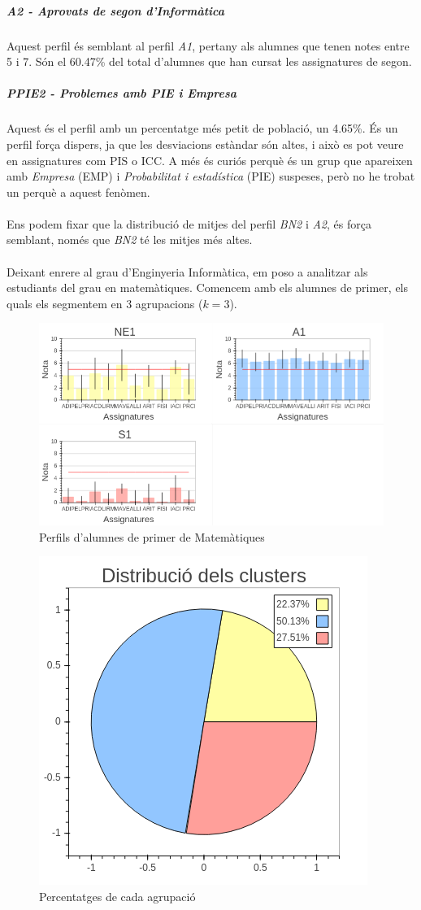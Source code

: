 \documentclass[12pt,a4paper,catalan]{article}
\begin{document}
\subparagraph{A2 - Aprovats de segon d'Informàtica}
Aquest perfil és semblant al perfil \textit{A1}, pertany als alumnes que tenen notes entre 5 i 7. Són el 60.47\% del total d'alumnes que han cursat les assignatures de segon.

\subparagraph{PPIE2 - Problemes amb PIE i Empresa}
Aquest és el perfil amb un percentatge més petit de població, un 4.65\%. És un perfil força dispers, ja que les desviacions estàndar són altes, i això es pot veure en assignatures com PIS o ICC. A més és curiós perquè és un grup que apareixen amb \textit{Empresa} (EMP) i \textit{Probabilitat i estadística} (PIE) suspeses, però no he trobat un perquè a aquest fenòmen.
\\
\\
Ens podem fixar que la distribució de mitjes del perfil \textit{BN2} i \textit{A2}, és força semblant, només que \textit{BN2} té les mitjes més altes.
\\
\\
Deixant enrere al grau d'Enginyeria Informàtica, em poso a analitzar als estudiants del grau en matemàtiques. Comencem amb els alumnes de primer, els quals els segmentem en 3 agrupacions ($k=3$).

\newpage

\begin{figure}[h]
\centering
\includegraphics[width=.9\linewidth]{img/perfils_primer_mates.png}
\caption{Perfils d'alumnes de primer de Matemàtiques}
\end{figure}

\begin{figure}[h]
\centering
\includegraphics[width=.4\linewidth]{img/perfils_primer_mates_pastilla.png}
\caption{Percentatges de cada agrupació}
\end{figure}
\end{document}
